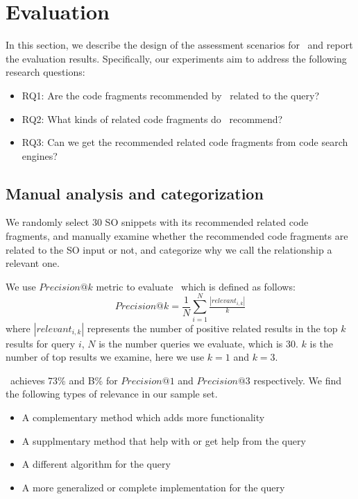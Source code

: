 \section{Evaluation}
\label{sec:Evaluation}
In this section, we describe the design of the assessment scenarios for \tool\ and report the evaluation results. Specifically, our experiments aim to address the following research questions:
\begin{itemize}
	\item RQ1: Are the code fragments recommended by \tool\ related to the query?
	\item RQ2: What kinds of related code fragments do \tool\ recommend?
	\item RQ3: Can we get the recommended related code fragments from code search engines?
\end{itemize}

\subsection{Manual analysis and categorization}
We randomly select 30 SO snippets with its recommended related code fragments, and manually examine whether the recommended code fragments are related to the SO input or not, and categorize why we call the relationship a relevant one.

We use $Precision@k$ metric to evaluate \tool\  which is defined as follows:
\begin{equation}
Precision@k = \frac{1}{N}\sum_{i=1}^{N}\tfrac{\left | relevant_{i,k} \right |}{k}
\end{equation}
where $\left | relevant_{i,k} \right |$ represents the number of positive related results in the top $k$ results for query $i$, $N$ is the number queries we evaluate, which is $30$. $k$ is the number of top results we examine, here we use $k=1$ and $k=3$.

\tool\ achieves 73\% and B\% for $Precision@1$ and $Precision@3$ respectively.
We find the following types of relevance in our sample set.
\begin{itemize}
	\item A complementary method which adds more functionality
	\item A supplmentary method that help with or get help from the query
	\item A different algorithm for the query 
	\item A more generalized or complete implementation for the query	
\end{itemize}

